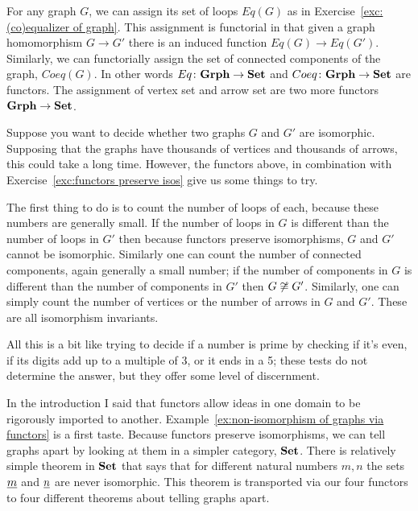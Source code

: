 \documentclass[CT4S-EN-RU]{subfiles}
\begin{document}
\begin{exerciseRUS}\label{exc:functors preserve isos}
\end{exerciseRUS}

\begin{exampleENG}\label{ex:non-isomorphism of graphs via functors}
For any graph $G$, we can assign its set of loops $Eq(G)$ as in Exercise~\ref{exc:(co)equalizer of graph}. This assignment is functorial in that given a graph homomorphism $G\to G'$ there is an induced function $Eq(G)\to Eq(G')$. Similarly, we can functorially assign the set of connected components of the graph, $Coeq(G)$. In other words $Eq\colon{\mathbf{Grph}}\rightarrow{\mathbf{Set}}$ and $Coeq\colon{\mathbf{Grph}}\rightarrow{\mathbf{Set}}$ are functors. The assignment of vertex set and arrow set are two more functors ${\mathbf{Grph}}\rightarrow{\mathbf{Set}}$.

Suppose you want to decide whether two graphs $G$ and $G'$ are isomorphic. Supposing that the graphs have thousands of vertices and thousands of arrows, this could take a long time. However, the functors above, in combination with Exercise~\ref{exc:functors preserve isos} give us some things to try.

The first thing to do is to count the number of loops of each, because these numbers are generally small. If the number of loops in $G$ is different than the number of loops in $G'$ then because functors preserve isomorphisms, $G$ and $G'$ cannot be isomorphic. Similarly one can count the number of connected components, again generally a small number; if the number of components in $G$ is different than the number of components in $G'$ then $G\not\cong G'$. Similarly, one can simply count the number of vertices or the number of arrows in $G$ and $G'$. These are all isomorphism invariants.  

All this is a bit like trying to decide if a number is prime by checking if it's even, if its digits add up to a multiple of 3, or it ends in a 5; these tests do not determine the answer, but they offer some level of discernment.
\end{exampleENG}

\begin{exampleRUS}\label{ex:non-isomorphism of graphs via functors}
\end{exampleRUS}

\begin{remarkENG}
In the introduction I said that functors allow ideas in one domain to be rigorously imported to another. Example~\ref{ex:non-isomorphism of graphs via functors} is a first taste. Because functors preserve isomorphisms, we can tell graphs apart by looking at them in a simpler category, ${\mathbf{Set}}$. There is relatively simple theorem in ${\mathbf{Set}}$ that says that for different natural numbers $m,n$ the sets $\underline{m}$ and $\underline{n}$ are never isomorphic. This theorem is transported via our four functors to four different theorems about telling graphs apart.
\end{remarkENG}
\end{document}
